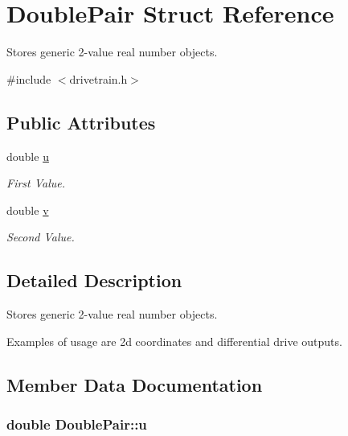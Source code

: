 \hypertarget{structDoublePair}{}\section{Double\+Pair Struct Reference}
\label{structDoublePair}


Stores generic 2-\/value real number objects.  




{\ttfamily \#include $<$drivetrain.\+h$>$}

\subsection*{Public Attributes}
\begin{DoxyCompactItemize}
\item 
double \hyperlink{structDoublePair_a1a627a95488b8e575b162a37cc89b37e}{u}
\begin{DoxyCompactList}\small\item\em First Value. \end{DoxyCompactList}\item 
double \hyperlink{structDoublePair_ac04c81233ea3873cc9a790864a07735c}{v}
\begin{DoxyCompactList}\small\item\em Second Value. \end{DoxyCompactList}\end{DoxyCompactItemize}


\subsection{Detailed Description}
Stores generic 2-\/value real number objects. 

Examples of usage are 2d coordinates and differential drive outputs. 

\subsection{Member Data Documentation}
\subsubsection[{\texorpdfstring{u}{u}}]{\setlength{\rightskip}{0pt plus 5cm}double Double\+Pair\+::u}\hypertarget{structDoublePair_a1a627a95488b8e575b162a37cc89b37e}{}\label{structDoublePair_a1a627a95488b8e575b162a37cc89b37e}


